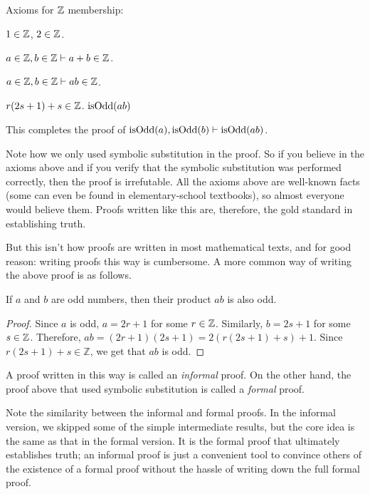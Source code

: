 Axioms for $\mathbb{Z}$ membership:
\begin{tightemize}
\item $1 \in \mathbb{Z}$, $2 \in \mathbb{Z}$.
\item $a \in \mathbb{Z}, b \in \mathbb{Z} \vdash a + b \in \mathbb{Z}$.
\item $a \in \mathbb{Z}, b \in \mathbb{Z} \vdash ab \in \mathbb{Z}$.
\end{tightemize}

\begin{formalproof}
\State \label{p1:tinZ}$r(2s+1)+s \in \mathbb{Z}$.
\State \label{p1:final}$\operatorname{isOdd}(ab)$
\end{formalproof}

This completes the proof of $\operatorname{isOdd}(a), \operatorname{isOdd}(b) \vdash \operatorname{isOdd}(ab)$.

Note how we only used symbolic substitution in the proof.
So if you believe in the axioms above and if you verify that the symbolic
substitution was performed correctly, then the proof is irrefutable.
All the axioms above are well-known facts
(some can even be found in elementary-school textbooks),
so almost everyone would believe them.
Proofs written like this are, therefore, the gold standard in establishing truth.

But this isn't how proofs are written in most mathematical texts,
and for good reason: writing proofs this way is cumbersome.
A more common way of writing the above proof is as follows.

\begin{lemma}
If $a$ and $b$ are odd numbers, then their product $ab$ is also odd.
\end{lemma}
\begin{proof}
Since $a$ is odd, $a = 2r+1$ for some $r \in \mathbb{Z}$.
Similarly, $b = 2s+1$ for some $s \in \mathbb{Z}$.
Therefore, $ab = (2r+1)(2s+1) = 2(r(2s+1)+s)+1$.
Since $r(2s+1)+s \in \mathbb{Z}$, we get that $ab$ is odd.
\end{proof}

A proof written in this way is called an \emph{informal} proof.
On the other hand, the proof above that used symbolic substitution
is called a \emph{formal} proof.

Note the similarity between the informal and formal proofs.
In the informal version, we skipped some of the simple intermediate results,
but the core idea is the same as that in the formal version.
It is the formal proof that ultimately establishes truth;
an informal proof is just a convenient tool to convince others of the existence of
a formal proof without the hassle of writing down the full formal proof.

